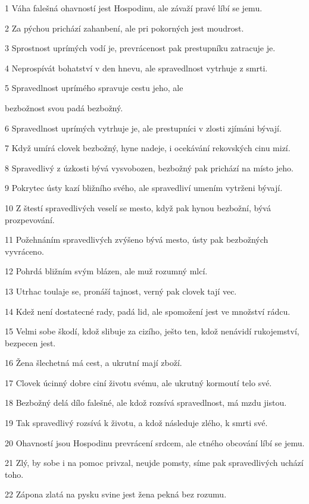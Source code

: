 \par 1 Váha falešná ohavností jest Hospodinu, ale závaží pravé líbí se jemu.
\par 2 Za pýchou prichází zahanbení, ale pri pokorných jest moudrost.
\par 3 Sprostnost uprímých vodí je, prevrácenost pak prestupníku zatracuje je.
\par 4 Neprospívát bohatství v den hnevu, ale spravedlnost vytrhuje z smrti.
\par 5 Spravedlnost uprímého spravuje cestu jeho, ale \par bezbožnost svou padá bezbožný.
\par 6 Spravedlnost uprímých vytrhuje je, ale prestupníci v zlosti zjímáni bývají.
\par 7 Když umírá clovek bezbožný, hyne nadeje, i ocekávání rekovských cinu mizí.
\par 8 Spravedlivý z úzkosti bývá vysvobozen, bezbožný pak prichází na místo jeho.
\par 9 Pokrytec ústy kazí bližního svého, ale spravedliví umením vytrženi bývají.
\par 10 Z štestí spravedlivých veselí se mesto, když pak hynou bezbožní, bývá prozpevování.
\par 11 Požehnáním spravedlivých zvýšeno bývá mesto, ústy pak bezbožných vyvráceno.
\par 12 Pohrdá bližním svým blázen, ale muž rozumný mlcí.
\par 13 Utrhac toulaje se, pronáší tajnost, verný pak clovek tají vec.
\par 14 Kdež není dostatecné rady, padá lid, ale spomožení jest ve množství rádcu.
\par 15 Velmi sobe škodí, kdož slibuje za cizího, ješto ten, kdož nenávidí rukojemství, bezpecen jest.
\par 16 Žena šlechetná má cest, a ukrutní mají zboží.
\par 17 Clovek úcinný dobre ciní životu svému, ale ukrutný kormoutí telo své.
\par 18 Bezbožný delá dílo falešné, ale kdož rozsívá spravedlnost, má mzdu jistou.
\par 19 Tak spravedlivý rozsívá k životu, a kdož následuje zlého, k smrti své.
\par 20 Ohavností jsou Hospodinu prevrácení srdcem, ale ctného obcování líbí se jemu.
\par 21 Zlý, by sobe i na pomoc privzal, neujde pomsty, síme pak spravedlivých uchází toho.
\par 22 Zápona zlatá na pysku svine jest žena pekná bez rozumu.
